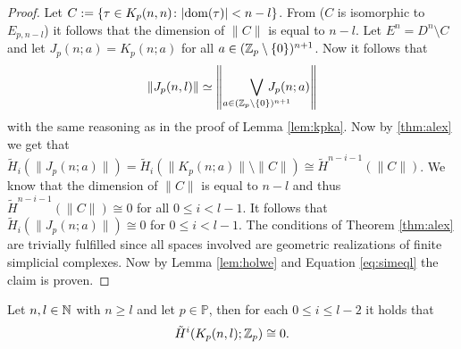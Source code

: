 \begin{proof}
  Let $C := \{\tau \in K_p(n,n)\colon |{\rm dom}(\tau)| < n - l\}$. From \cite[p. 2513, Remark]{mc2002} ($C$ is isomorphic to $E_{p,n-l}$) it follows that the dimension of $\lVert C \rVert$ is equal to $n-l$.
  Let $E^n = D^n\setminus C$ and let $J_p(n;a) = K_p(n;a)$ for all $a \in (\mathbb{Z}_p\setminus \{0\})^{n+1}$. Now it follows that
  \begin{equation}\label{eq:simeql}
    \lVert J_p(n,l) \rVert \simeq \left\lVert \bigvee\limits_{a \in (\Z_p \setminus \{0\})^{n+1}} \hspace*{-20px}J_p(n;a) \right\rVert
  \end{equation}
  with the same reasoning as in the proof of Lemma \ref{lem:kpka}.
  Now by \ref{thm:alex} we get that $\tilde{H}_i(\lVert J_p(n;a) \rVert) = \tilde{H}_i(\rVert K_p(n;a) \rVert \setminus \lVert C \rVert) \cong \tilde{H}^{n-i-1}(\lVert C\rVert)$. We know that the dimension of $\lVert C \rVert$ is equal to $n-l$ and thus $\tilde{H}^{n-i-1}(\lVert C \rVert) \cong 0$ for all $0\leq i < l-1$. It follows that $\tilde{H}_i(\lVert J_p(n;a) \rVert) \cong 0$ for $0 \leq i < l-1$. The conditions of Theorem \ref{thm:alex} are trivially fulfilled since all spaces involved are geometric realizations of finite simplicial complexes. Now by Lemma \ref{lem:holwe} and Equation \ref{eq:simeql} the claim is proven. 
\end{proof}

\begin{lemma}\label{lem:knp}
  Let $n, l \in \mathbb{N}$ with $n \geq l$ and let $p \in \mathbb{P}$, then for each $0 \leq i \leq l-2$ it holds that
  \begin{equation*}
    \tilde{H}^i(K_p(n,l); \mathbb{Z}_p) \cong 0.
  \end{equation*}
\end{lemma}

